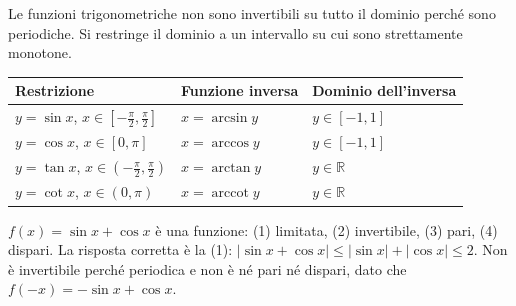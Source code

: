 \documentclass[11pt,a4paper]{article}
\begin{document}
Le funzioni trigonometriche non sono invertibili su tutto il dominio perché sono periodiche. Si restringe il dominio a un intervallo su cui sono strettamente monotone.
\begin{center}
\renewcommand{\arraystretch}{1.4}
\begin{tabular}{@{}lll@{}}
\toprule
Restrizione & Funzione inversa & Dominio dell'inversa \\
\midrule
$y = \sin x$, $x \in \left[-\frac{\pi}{2}, \frac{\pi}{2}\right]$ & $x = \arcsin y$ & $y \in [-1, 1]$ \\
$y = \cos x$, $x \in [0, \pi]$ & $x = \arccos y$ & $y \in [-1, 1]$ \\
$y = \tan x$, $x \in \left(-\frac{\pi}{2}, \frac{\pi}{2}\right)$ & $x = \arctan y$ & $y \in \mathbb{R}$ \\
$y = \cot x$, $x \in (0, \pi)$ & $x = \operatorname{arccot} y$ & $y \in \mathbb{R}$ \\
\bottomrule
\end{tabular}
\end{center}

\begin{esempio}[Test]
$f(x) = \sin x + \cos x$ è una funzione: (1) limitata, (2) invertibile, (3) pari, (4) dispari. La risposta corretta è la (1): $|\sin x + \cos x| \le |\sin x| + |\cos x| \le 2$. Non è invertibile perché periodica e non è né pari né dispari, dato che $f(-x) = -\sin x + \cos x$.
\end{esempio}
\end{document}
